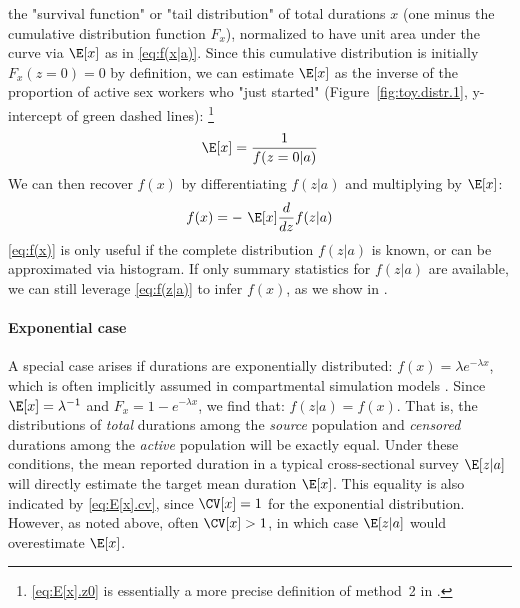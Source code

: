 the "survival function" or "tail distribution" of total durations $x$
(one minus the cumulative distribution function $F_x$),
normalized to have unit area under the curve via $\E[x]$ as in \eqref{eq:f(x|a)}.
Since this cumulative distribution is initially $F_x(z=0) = 0$ by definition,
we can estimate $\E[x]$ as
the inverse of the proportion of active sex workers who "just started"
(Figure~\ref{fig:toy.distr.1}, y-intercept of green dashed lines):%
\footnote{\eqref{eq:E[x].z0} is essentially
  a more precise definition of method~2 in \cite{Fazito2012}.}
\begin{equation}
  \E[x] = \frac{1}{f(z=0|a)}
  \label{eq:E[x].z0}
\end{equation}
We can then recover $f(x)$ by differentiating $f(z|a)$ and multiplying by $\E[x]$:
\begin{equation}
  f(x) = - ~ \E[x] \frac{d}{dz} f(z|a)
  \label{eq:f(x)}
\end{equation}
\eqref{eq:f(x)} is only useful if the complete distribution $f(z|a)$ is known,
or can be approximated \eg via histogram.
If only summary statistics for $f(z|a)$ are available,
we can still leverage \eqref{eq:f(z|a)} to infer $f(x)$, as we show in .
\paragraph{Exponential case}
A special case arises if durations are exponentially distributed:
$f(x) = \lambda e^{-\lambda x}$,
which is often implicitly assumed in compartmental simulation models \cite{Garnett2011}.
Since $\E[x] = \lambda^{-1}$ and $F_x = 1 - e^{-\lambda x}$,
we find that: $f(z|a) = f(x)$.
That is, the distributions of
\emph{total} durations among the \emph{source} population and
\emph{censored} durations among the \emph{active} population
will be exactly equal.
Under these conditions,
the mean reported duration in a typical cross-sectional survey $\E[z|a]$
will directly estimate the target mean duration $\E[x]$.
This equality is also indicated by \eqref{eq:E[x].cv},
since $\CV[x] = 1$ for the exponential distribution.
However, as noted above, often $\CV[x] > 1$,
in which case $\E[z|a]$ would overestimate $\E[x]$.
